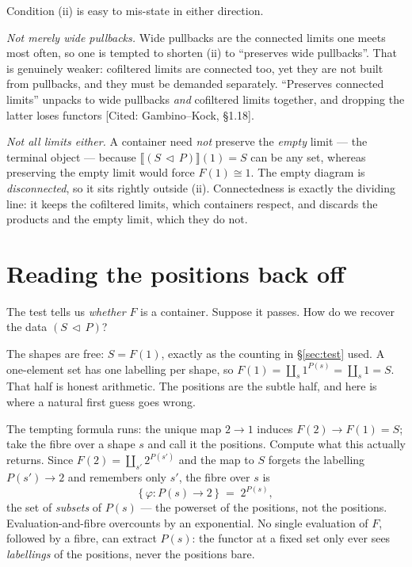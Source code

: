 \documentclass[11pt]{article}
\theoremstyle{plain}
\theoremstyle{definition}
\newcommand{\iso}{\cong}
\newcommand{\ext}[1]{\llbracket #1 \rrbracket}
\newcommand{\cont}[2]{(#1\,\triangleleft\,#2)}
\newcommand{\prov}[1]{\hfill\textsf{[#1]}}
\begin{document}
\begin{warnbox}
Condition (ii) is easy to mis-state in either direction.

\emph{Not merely wide pullbacks.} Wide pullbacks are the connected limits one meets
most often, so one is tempted to shorten (ii) to ``preserves wide pullbacks''. That is
genuinely weaker: cofiltered limits are connected too, yet they are not built from
pullbacks, and they must be demanded separately. ``Preserves connected limits'' unpacks
to wide pullbacks \emph{and} cofiltered limits together, and dropping the latter loses
functors \prov{Cited: Gambino--Kock, \S1.18}.

\emph{Not all limits either.} A container need \emph{not} preserve the \emph{empty}
limit --- the terminal object --- because $\ext{\cont SP}(1)=S$ can be any set, whereas
preserving the empty limit would force $F(1)\iso1$. The empty diagram is
\emph{disconnected}, so it sits rightly outside (ii). Connectedness is exactly the
dividing line: it keeps the cofiltered limits, which containers respect, and discards
the products and the empty limit, which they do not.
\end{warnbox}

\section{Reading the positions back off}
\label{sec:recover}

The test tells us \emph{whether} $F$ is a container. Suppose it passes. How do we
recover the data $\cont SP$?

The shapes are free: $S=F(1)$, exactly as the counting in \S\ref{sec:test} used. A
one-element set has one labelling per shape, so $F(1)=\coprod_s 1^{P(s)}=\coprod_s
1=S$. That half is honest arithmetic. The positions are the subtle half, and here is
where a natural first guess goes wrong.

\begin{warnbox}
The tempting formula runs: the unique map $2\to1$ induces $F(2)\to F(1)=S$; take the
fibre over a shape $s$ and call it the positions. Compute what this actually returns.
Since $F(2)=\coprod_{s'}2^{P(s')}$ and the map to $S$ forgets the labelling
$P(s')\to 2$ and remembers only $s'$, the fibre over $s$ is
\[
  \bigl\{\,\varphi\colon P(s)\to 2\,\bigr\} \;=\; 2^{P(s)},
\]
the set of \emph{subsets} of $P(s)$ --- the powerset of the positions, not the
positions. Evaluation-and-fibre overcounts by an exponential. No single evaluation of
$F$, followed by a fibre, can extract $P(s)$: the functor at a fixed set only ever
sees \emph{labellings} of the positions, never the positions bare.
\end{warnbox}
\end{document}
